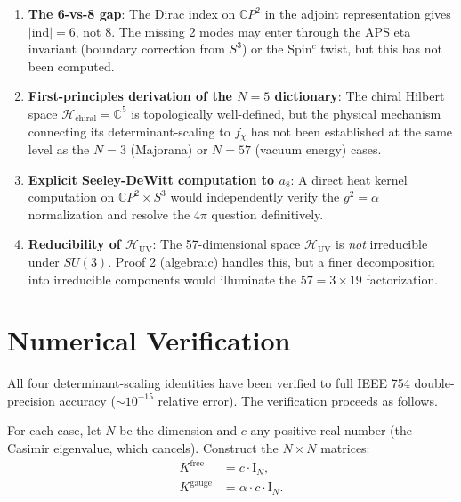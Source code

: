 \documentclass[11pt]{article}
\theoremstyle{definition}
\theoremstyle{remark}
\newcommand{\CP}{\mathbb{C}P}
\newcommand{\Id}{\mathrm{I}}
\begin{document}
\begin{tcolorbox}[colback=red!5!white, colframe=red!70!black,
  title=\textbf{Open Problems}]
\begin{enumerate}
\item \textbf{The 6-vs-8 gap}: The Dirac index on $\CP^2$ in the
adjoint representation gives $|\mathrm{ind}| = 6$, not 8. The missing
2 modes may enter through the APS eta invariant (boundary correction
from $S^3$) or the Spin$^c$ twist, but this has not been computed.

\item \textbf{First-principles derivation of the $N = 5$ dictionary}:
The chiral Hilbert space $\mathcal{H}_{\mathrm{chiral}} =
\mathbb{C}^5$ is topologically well-defined, but the physical mechanism
connecting its determinant-scaling to $f_\chi$ has not been established
at the same level as the $N = 3$ (Majorana) or $N = 57$ (vacuum energy)
cases.

\item \textbf{Explicit Seeley-DeWitt computation to $a_8$}: A direct
heat kernel computation on $\CP^2 \times S^3$ would independently
verify the $g^2 = \alpha$ normalization and resolve the $4\pi$
question definitively.

\item \textbf{Reducibility of $\mathcal{H}_{\mathrm{UV}}$}: The
57-dimensional space $\mathcal{H}_{\mathrm{UV}}$ is \textit{not}
irreducible under $SU(3)$. Proof 2 (algebraic) handles this, but a
finer decomposition into irreducible components would illuminate the
$57 = 3 \times 19$ factorization.
\end{enumerate}
\end{tcolorbox}


\section{Numerical Verification}
\label{sec:numerical}

All four determinant-scaling identities have been verified to full
IEEE 754 double-precision accuracy ($\sim 10^{-15}$ relative error).
The verification proceeds as follows.

For each case, let $N$ be the dimension and $c$ any positive real
number (the Casimir eigenvalue, which cancels). Construct the
$N \times N$ matrices:
\begin{align}
K^{\mathrm{free}} &= c \cdot \Id_N, \\
K^{\mathrm{gauge}} &= \alpha \cdot c \cdot \Id_N.
\end{align}
\end{document}
